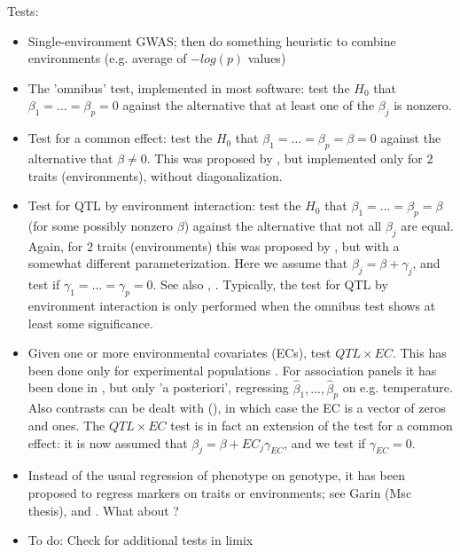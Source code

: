 \documentclass[12pt]{article}
\begin{document}
Tests:
\begin{itemize}
	\item Single-environment GWAS; then do something heuristic to combine environments (e.g. average of $-log(p)$ values)
	\item The 'omnibus' test, implemented in most software: test the $H_0$ that $\beta_1 = \ldots = \beta_p = 0$ against the alternative that at least one of the $\beta_j$ is nonzero.  
%
	\item Test for a common effect: test the $H_0$ that $\beta_1 = \ldots = \beta_p = \beta = 0$ against the alternative that  $\beta \neq 0$. This was proposed by \cite{korte_etal_2012}, but implemented only for 2 traits (environments), without diagonalization. 
%
	\item Test for QTL by environment interaction: test the $H_0$ that $\beta_1 = \ldots = \beta_p = \beta$ (for some possibly nonzero $\beta$) against the alternative that not all $\beta_j$ are equal. Again, for 2 traits (environments) this was proposed by \cite{korte_etal_2012}, but with a somewhat different parameterization. Here we assume that $\beta_j = \beta + \gamma_j$, and test if $\gamma_1 = \ldots = \gamma_p = 0$.  
	See also \cite{elsoda_etal_2014}, \cite{elsoda_etal_2015}. Typically, the  test for QTL by environment interaction is only performed when the omnibus test shows at least some significance.
	
	\item Given one or more environmental covariates (ECs), test $QTL \times EC$. This has been done only for experimental populations \cite{boer_etal_2007}. For association panels it has been done in \cite{millet_etal_2016}, but only 'a posteriori', regressing $\hat \beta_1 , \ldots,  \hat \beta_p $ on e.g. temperature. Also contrasts can be dealt with (\cite{thoen_etal_2017}), in which case the EC is a vector of zeros and ones. The $QTL \times EC$ test is in fact an extension of the test for a common effect: it is now assumed that $\beta_j = \beta + EC_{j} \gamma_{EC}$, and we test if $\gamma_{EC} = 0.$
	
	\item Instead of the usual regression of phenotype on genotype, it has been proposed to regress markers on traits or environments; see Garin (Msc thesis), 
	\cite{sung_etal_2016_gwas_longitudinal} and \cite{feng_2014}. What about \cite{he_etal_2013_multitrait_gwas} ?
	\item To do: Check for additional tests in limix
\end{itemize}
\end{document}
